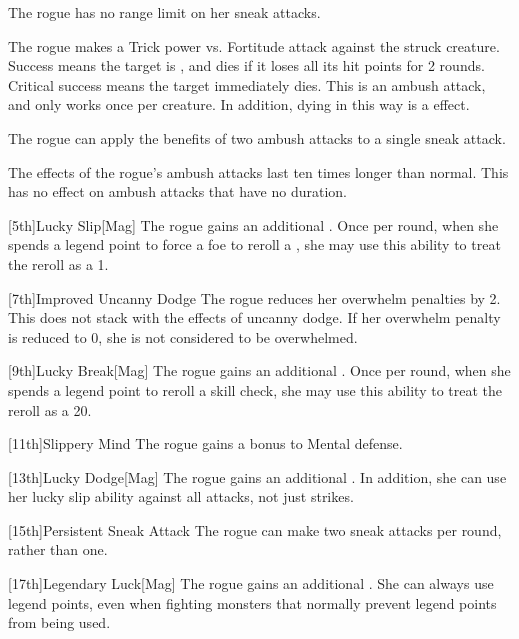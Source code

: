         The rogue has no range limit on her sneak attacks.

        The rogue makes a Trick power vs. Fortitude attack against the struck creature.
        Success means the target is \staggered, and dies if it loses all its hit points for 2 rounds.
        Critical success means the target immediately dies.
        This is an ambush attack, and only works once per creature.
        In addition, dying in this way is a  effect.

        The rogue can apply the benefits of two ambush attacks to a single sneak attack.

        The effects of the rogue's ambush attacks last ten times longer than normal.
        This has no effect on ambush attacks that have no duration.

        [5th]{Lucky Slip}[Mag]
        The rogue gains an additional .
        Once per round, when she spends a legend point to force a foe to reroll a , she may use this ability to treat the reroll as a 1.

        [7th]{Improved Uncanny Dodge}
        The rogue reduces her overwhelm penalties by 2.
        This does not stack with the effects of uncanny dodge.
        If her overwhelm penalty is reduced to 0, she is not considered to be overwhelmed.

        [9th]{Lucky Break}[Mag]
        The rogue gains an additional .
        Once per round, when she spends a legend point to reroll a skill check, she may use this ability to treat the reroll as a 20.

        [11th]{Slippery Mind}
        The rogue gains a  bonus to Mental defense.

        [13th]{Lucky Dodge}[Mag]
        The rogue gains an additional .
        In addition, she can use her lucky slip ability against all attacks, not just strikes.

        [15th]{Persistent Sneak Attack}
        The rogue can make two sneak attacks per round, rather than one.

        [17th]{Legendary Luck}[Mag]
        The rogue gains an additional .
        She can always use legend points, even when fighting monsters that normally prevent legend points from being used.

